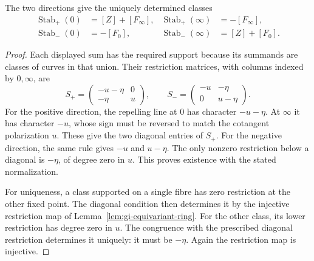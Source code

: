 \begin{proposition}\label{prop:gi-stable-classes}
The two directions give the uniquely determined classes
\begin{align*}
 \operatorname{Stab}_+(0)&=[Z]+[F_\infty],&
 \operatorname{Stab}_+(\infty)&=-[F_\infty],\\
 \operatorname{Stab}_-(0)&=-[F_0],&
 \operatorname{Stab}_-(\infty)&=[Z]+[F_0].
\end{align*}
\end{proposition}
\begin{proof}
Each displayed sum has the required support because its summands are classes of curves in that union.
Their restriction matrices, with columns indexed by $0,\infty$, are
\begin{equation}\label{eq:gi-stable-matrices}
 S_+=\begin{pmatrix}-u-\eta&0\\-\eta&u\end{pmatrix},\qquad
 S_-=\begin{pmatrix}-u&-\eta\\0&u-\eta\end{pmatrix}.
\end{equation}
For the positive direction, the repelling line at $0$ has character $-u-\eta$.
At $\infty$ it has character $-u$, whose sign must be reversed to match the cotangent polarization $u$.
These give the two diagonal entries of $S_+$.
For the negative direction, the same rule gives $-u$ and $u-\eta$.
The only nonzero restriction below a diagonal is $-\eta$, of degree zero in $u$.
This proves existence with the stated normalization.

For uniqueness, a class supported on a single fibre has zero restriction at the other fixed point.
The diagonal condition then determines it by the injective restriction map of Lemma~\ref{lem:gi-equivariant-ring}.
For the other class, its lower restriction has degree zero in $u$.
The congruence with the prescribed diagonal restriction determines it uniquely: it must be $-\eta$.
Again the restriction map is injective.
\end{proof}

